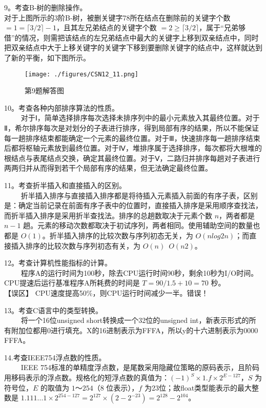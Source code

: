 9。考查B-树的删除操作。\\
对于上图所示的3阶B-树，被删关键字78所在结点在删除前的关键字个数 $=1= \lceil 3/2 \rceil -1$，且其左兄弟结点的关键字个数 $=2 \ge \lceil 3/2 \rceil $，属于“兄弟够借”的情况，则需把该结点的左兄弟结点中最大的关键字上移到双亲结点中，同时把双亲结点中大于上移关键字的关键字下移到要删除关键字的结点中，这样就达到了新的平衡，如下图所示。
\begin{figure}[ht]
\centering
\texttt{[image: ./figures/CSN12\_11.png]}
\caption{第9题解答图} \label{CSN12_fig11}
\end{figure}

10。考查各种内部排序算法的性质。\\
$\qquad$ 对于Ⅰ，简单选择排序每次选择未排序列中的最小元素放入其最终位置。对于Ⅱ，希尔排序每次是对划分的子表进行排序，得到局部有序的结果，所以不能保证每一趟排序结束都能确定一个元素的最终位置。对于Ⅲ，快速排序每一趟排序结束后都将枢轴元素放到最终位置。对于Ⅳ，堆排序属于选择排序，每次都将大根堆的根结点与表尾结点交换，确定其最终位置。对于Ⅴ，二路归并排序每趟对子表进行两两归并从而得到若干个局部有序的结果，但无法确定最终位置。

11。考查折半插入和直接插入的区别。\\
$\qquad$ 折半插入排序与直接插入排序都是将待插入元素插入前面的有序子表，区别是：确定当前记录在前面有序子表中的位置时，直接插入排序是采用顺序查找法，而折半插入排序是采用折半查找法。排序的总趟数取决于元素个数 $n$，两者都是 $n-1$ 趟。元素的移动次数都取决于初试序列，两者相同。使用辅助空间的数量也都是 $O(1)$。折半插入排序的比较次数与序列初态无关，为 $O(nlog2n)$；而直接插入排序的比较次数与序列初态有关，为 $O(n)$~$O(n2)$。

12。考查计算机性能指标的计算。\\
$\qquad$ 程序A的运行时间为100秒，除去CPU运行时间90秒，剩余10秒为I/O时间。CPU提速后运行基准程序A所耗费的时间是 $T=90/1.5+10=70$ 秒。 \\
【误区】 CPU速度提高50\%，则CPU运行时间减少一半。错误！

13。考查C语言中的类型转换。\\
$\qquad$ 将一个16位unsigned short转换成一个32位的unsigned int，新表示形式的所有附加位都用0进行填充。X的16进制表示为FFFA，所以y的十六进制表示为0000 FFFA。

14.考查IEEE754浮点数的性质。\\
$\qquad$ IEEE 754标准的单精度浮点数，是尾数采用隐藏位策略的原码表示，且阶码用移码表示的浮点数。规格化的短浮点数的真值为：$(-1)^S\times1.f\times2^{E-127}$，$S$ 为符号位，$E$ 的取值为 $1$～$254$（$8$ 位表示），$f$ 为23位；故float类型能表示的最大整数是 $1.111...1 \times 2^{254-127}=2^{127} \times (2-2^{-23})=2^{128}-2^{104}$。

